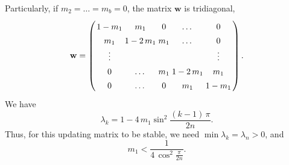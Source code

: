 \documentclass[reprint]{revtex4-1}
\begin{document}
Particularly, if $m_2 = \dots = m_b = 0$,
the matrix $\mathbf w$ is tridiagonal,
%
\begin{equation}
\arraycolsep=1.4pt\def\arraystretch{1.4}
\mathbf w
=
\left(
  \begin{array}{cccccccc}
    1 - m_1   & m_1 & 0 & \dots & 0 \\
    m_1 & 1 - 2 \, m_1  & m_1 & \dots & 0 \\
    \vdots & &  & & \vdots \\
    0 & \dots & m_1 & 1 - 2 \, m_1  & m_1 \\
    0 & \dots & 0 & m_1 & 1 - m_1
  \end{array}
\right).
\label{eq:wtridiag}
\end{equation}
%
We have
\begin{equation}
  \lambda_k = 1 - 4 \, m_1 \sin^2 \frac{(k - 1) \, \pi}{2n}.
\label{eq:wtridiag_eigenvalue}
\end{equation}
%
Thus, for this updating matrix to be stable,
we need
$\min \lambda_k = \lambda_n > 0$,
and
$$
m_1 < \frac{1}{4 \, \cos^2\frac{\pi}{2n} }.
$$
\end{document}
